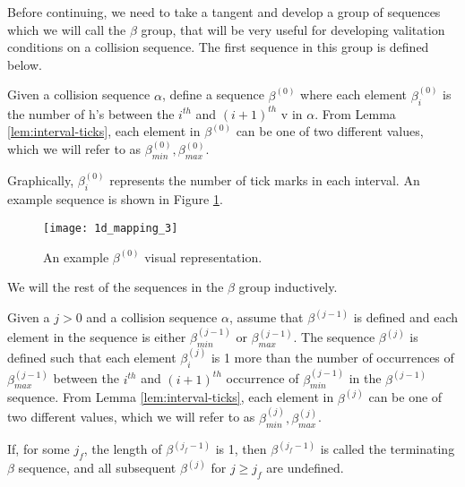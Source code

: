 
Before continuing, we need to take a tangent and develop a group of sequences which we will call the $\beta$ group, that will be very useful for developing valitation conditions on a collision sequence. The first sequence in this group is defined below.

\begin{definition}
	Given a collision sequence $\alpha$, define a sequence $\beta^{(0)}$ where each element $\beta^{(0)}_i$ is the number of h's between the $i^{th}$ and $(i+1)^{th}$ v in $\alpha$. From Lemma \ref{lem:interval-ticks}, each element in $\beta^{(0)}$ can be one of two different values, which we will refer to as $\beta^{(0)}_{min}, \beta^{(0)}_{max}$.
\end{definition}

Graphically, $\beta^{(0)}_i$ represents the number of tick marks in each interval. An example sequence is shown in Figure \ref{fig:beta-sequence}.

\begin{figure}[H]
  \begin{center}
    \texttt{[image: 1d\_mapping\_3]}
  \end{center}
  \vspace{-.2in} %
  \caption{\label{fig:beta-sequence} An example $\beta^{(0)}$ visual representation.}
\end{figure}

We will the rest of the sequences in the $\beta$ group inductively.

\begin{definition}
  Given a $j > 0$ and a collision sequence $\alpha$, assume that $\beta^{(j-1)}$ is defined and each element in the sequence is either $\beta^{(j-1)}_{min}$ or $\beta^{(j-1)}_{max}$. The sequence $\beta^{(j)}$ is defined such that each element $\beta^{(j)}_i$ is 1 more than the number of occurrences of $\beta^{(j-1)}_{max}$ between the $i^{th}$ and $(i+1)^{th}$ occurrence of $\beta^{(j-1)}_{min}$ in the $\beta^{(j-1)}$ sequence. From Lemma \ref{lem:interval-ticks}, each element in $\beta^{(j)}$ can be one of two different values, which we will refer to as $\beta^{(j)}_{min}, \beta^{(j)}_{max}$.

	If, for some $j_f$, the length of $\beta^{(j_f-1)}$ is 1, then $\beta^{(j_f-1)}$ is called the terminating $\beta$ sequence, and all subsequent $\beta^{(j)}$ for $j \ge j_f$ are undefined.
\end{definition}


